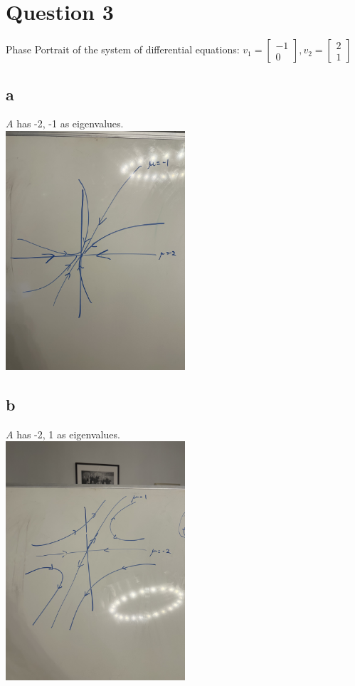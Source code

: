 \documentclass{article}
\begin{document}
\section*{Question 3}
Phase Portrait of the system of differential equations: $v_1 = \begin{bmatrix}
    -1 \\
    0
\end{bmatrix}, v_2 = \begin{bmatrix}
    2  \\
    1
\end{bmatrix}$
\subsection*{a}
$A$ has -2, -1 as eigenvalues. \\
\includegraphics[width=0.5\textwidth]{IMG_2796.jpg}
\subsection*{b}
$A$ has -2, 1 as eigenvalues. \\
\includegraphics[width=0.5\textwidth]{IMG_2797.jpg}
\end{document}

